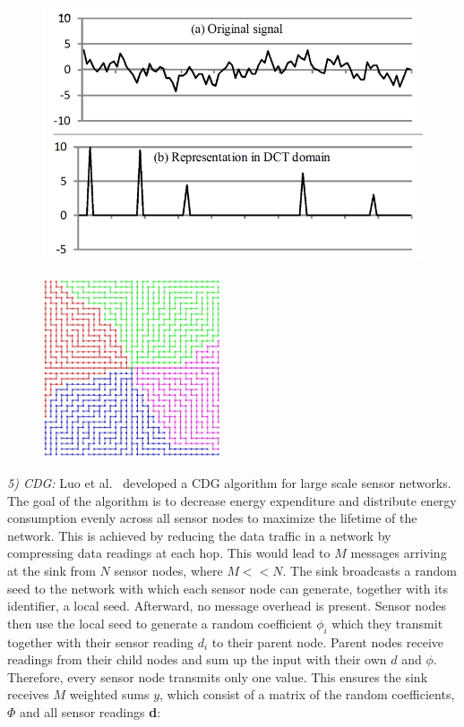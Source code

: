 \begin{figure}
\centering
\begin{minipage}{.5\textwidth}
  \centering
  \includegraphics[width=\linewidth]{images/example-signal-sparse.png}
  \label{fig:sparsesignal}
\end{minipage}%
\begin{minipage}{.5\textwidth}
  \centering
  \includegraphics[width=\linewidth, height=5.3cm]{images/grid-topology-luo.png}
  \label{fig:grid topology}
\end{minipage}
\end{figure}

\textit{5) \ac{CDG}:}
Luo et al.~\cite{luo2009compressive} developed a \ac{CDG} algorithm for large
scale sensor networks. The goal of the algorithm is to decrease energy
expenditure and distribute energy consumption evenly across all sensor nodes to
maximize the lifetime of the network. This is achieved by reducing the data
traffic in a network by compressing data readings at each hop. This would lead
to $ M $ messages arriving at the sink from $ N $ sensor nodes, where $ M << N
$. The sink broadcasts a random seed to the network with which each sensor node
can generate, together with its identifier, a local seed. Afterward, no message
overhead is present. Sensor nodes then use the local seed to generate a random
coefficient $ \phi_i $ which they transmit together with their sensor reading $
d_i $ to their parent node. Parent nodes receive readings from their child
nodes and sum up the input with their own $ d $ and $ \phi $. Therefore, every
sensor node transmits only one value. This ensures the sink receives $ M $
weighted sums $ y $, which consist of a matrix of the random coefficients, $
\Phi $ and all sensor readings \textbf{d}:

